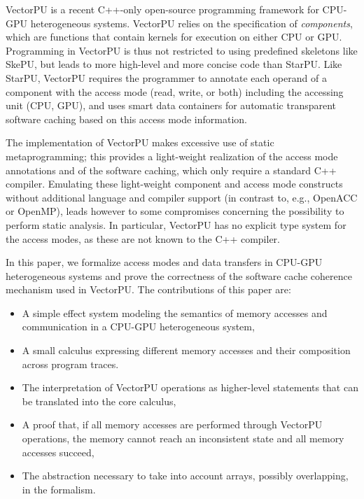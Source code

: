 VectorPU \cite{VectorPU-2017} is a recent C++-only
open-source
programming framework for CPU-GPU heterogeneous systems. 
VectorPU relies on the specification of 
\textit{components}, which are functions that contain kernels for execution
on either CPU or GPU. Programming in VectorPU is thus not restricted 
to using predefined skeletons like SkePU, 
but leads to more high-level and more concise code than StarPU. 
Like StarPU, VectorPU requires the programmer
to annotate each operand of a component
with the access mode (read, write, or both) including the 
accessing unit (CPU, GPU), and uses smart data containers for automatic transparent
software caching based on this access mode information.

The implementation of VectorPU makes excessive use of static metaprogramming; this provides a light-weight realization of the access mode annotations and of the software caching, 
which only require a standard C++ compiler. Emulating these 
light-weight
component and access mode constructs without additional language
and compiler support (in contrast to, e.g., OpenACC or OpenMP), 
leads however to some compromises concerning the possibility to perform static analysis.
In particular, VectorPU has no explicit type system for the
access modes, as these are not known to the C++ compiler.

In this paper, we  formalize access modes
and data transfers in CPU-GPU heterogeneous systems and prove 
the correctness of the software
cache coherence mechanism used in VectorPU.
The contributions of this paper are:

\begin{itemize}
\item A simple effect system modeling the semantics of memory
   accesses and communication in a CPU-GPU heterogeneous system,
\item A small calculus expressing different memory
   accesses and their composition across program traces. 
\item The interpretation of VectorPU operations as higher-level statements
    that can be translated into the core calculus,
\item A proof that, if all memory accesses are performed 
    through VectorPU operations, the memory cannot reach an 
    inconsistent state and all memory accesses succeed,
\item The abstraction necessary to take into account arrays, possibly overlapping, in the formalism.
\end{itemize}


